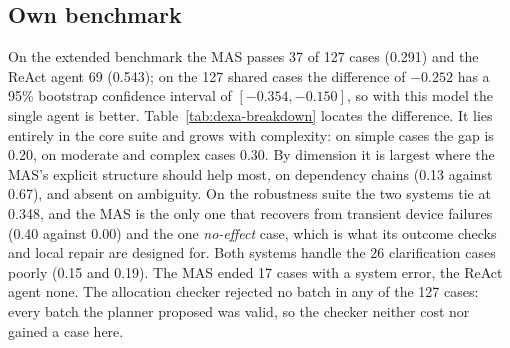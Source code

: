 \documentclass[a4paper,11pt]{article}
\begin{document}
\begin{table}[htbp]
  \centering
  \small
  \caption{Both systems with the same Gemma~4 31B on four benchmarks. Success rates are each
    benchmark's native binary score; HomeBench reports exact match and operation-level F1.
    The MAS runs with the Lean checker; ReAct has no admission step. ``pending'' = run in progress.}
  \label{tab:systems}
\end{table}

\subsection{Own benchmark}
\label{sec:eval-own}

On the extended benchmark the MAS passes 37 of 127 cases (0.291) and the ReAct agent 69 (0.543);
on the 127 shared cases the difference of $-0.252$ has a 95\% bootstrap confidence interval of
$[-0.354, -0.150]$, so with this model the single agent is better. Table~\ref{tab:dexa-breakdown}
locates the difference. It lies entirely in the core suite and grows with complexity: on simple
cases the gap is 0.20, on moderate and complex cases 0.30. By dimension it is largest where the
MAS's explicit structure should help most, on dependency chains (0.13 against 0.67), and absent on
ambiguity. On the robustness suite the two systems tie at 0.348, and the MAS is the only one that
recovers from transient device failures (0.40 against 0.00) and the one \emph{no-effect} case,
which is what its outcome checks and local repair are designed for. Both systems handle the 26
clarification cases poorly (0.15 and 0.19). The MAS ended 17 cases with a system error, the ReAct
agent none. The allocation checker rejected no batch in any of the 127 cases: every batch the
planner proposed was valid, so the checker neither cost nor gained a case here.
\end{document}
